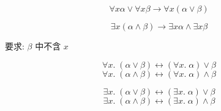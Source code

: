\begin{frame}{}
  \[
    \forall x \alpha \lor \forall x \beta \to \forall x (\alpha \lor \beta)
  \]

  \[
    \exists x (\alpha \land \beta) \to \exists x \alpha \land \exists x \beta
  \]
\end{frame}

\begin{frame}{}
  \begin{center}
    要求: $\beta$ 中不含 $x$
  \end{center}

  \[
    \forall x.\; (\alpha \lor \beta) \leftrightarrow (\forall x.\; \alpha) \lor \beta
  \]
  \[
    \forall x.\; (\alpha \land \beta) \leftrightarrow (\forall x.\; \alpha) \land \beta
  \]

  \pause
  \[
    \exists x.\; (\alpha \lor \beta) \leftrightarrow (\exists x.\; \alpha) \lor \beta
  \]
  \[
    \exists x.\; (\alpha \land \beta) \leftrightarrow (\exists x.\; \alpha) \land \beta
  \]
\end{frame}

